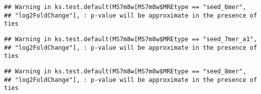 \documentclass[
]{article}
\newenvironment{Shaded}{\begin{snugshade}}{\end{snugshade}}
\newcommand{\FunctionTok}[1]{\textcolor[rgb]{0.13,0.29,0.53}{\textbf{#1}}}
\newcommand{\NormalTok}[1]{#1}
\newcommand{\OtherTok}[1]{\textcolor[rgb]{0.56,0.35,0.01}{#1}}
\newcommand{\SpecialCharTok}[1]{\textcolor[rgb]{0.81,0.36,0.00}{\textbf{#1}}}
\newcommand{\StringTok}[1]{\textcolor[rgb]{0.31,0.60,0.02}{#1}}
\begin{document}
\begin{verbatim}
## Warning in ks.test.default(MS7m8w[MS7m8w$MREtype == "seed_6mer",
## "log2FoldChange"], : p-value will be approximate in the presence of ties
\end{verbatim}

\begin{Shaded}
\end{Shaded}

\begin{verbatim}
## Warning in ks.test.default(MS7m8w[MS7m8w$MREtype == "seed_7mer_a1",
## "log2FoldChange"], : p-value will be approximate in the presence of ties
\end{verbatim}

\begin{Shaded}
\end{Shaded}

\begin{verbatim}
## Warning in ks.test.default(MS7m8w[MS7m8w$MREtype == "seed_8mer",
## "log2FoldChange"], : p-value will be approximate in the presence of ties
\end{verbatim}

\begin{Shaded}
\end{Shaded}
\end{document}
